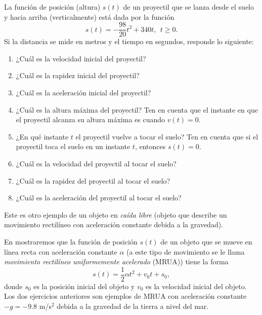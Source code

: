 \documentclass[12pt,a4paper]{book}
\begin{document}
    \begin{ejercicio}\label{ej:255}
        La función de posición (altura) $s(t)$ de un
        proyectil que se lanza desde el suelo y hacia arriba (verticalmente) está dada
        por la función
        \begin{equation*}
            s(t)=-\frac{98}{20}t^{2}+340t,\ \ t\geq 0.
        \end{equation*}
        Si la distancia se mide en metros y el tiempo en segundos, responde lo
        siguiente:
        \begin{enumerate}[nosep]
            \item ¿Cuál es la velocidad inicial del proyectil?
            \item ¿Cuál es la rapidez inicial del proyectil?
            \item ¿Cuál es la aceleración inicial del proyectil?
            \item ¿Cuál es la altura máxima del proyectil? Ten en cuenta que el instante en
            que el proyectil alcanza su altura máxima es cuando $v(t)=0$.
            \item ¿En qué instante $t$ el proyectil vuelve a tocar el suelo? Ten en cuenta que
            si el proyectil toca el suelo en un instante $t$, entonces $s(t)=0$.
            \item ¿Cuál es la velocidad del proyectil al tocar el suelo?
            \item ¿Cuál es la rapidez del proyectil al tocar el suelo?
            \item ¿Cuál es la aceleración del proyectil al tocar el suelo?
        \end{enumerate}
        Este es otro ejemplo de un objeto en \textit{caída libre} (objeto que describe un
        movimiento rectilíneo con aceleración constante debida a la gravedad).
    \end{ejercicio}

    En \cite{nunez2020calculoII} mostraremos que la función de posición $s(t)$ de un objeto que se
    mueve en línea recta con aceleración constante $\alpha$ (a este tipo de movimiento
    se le llama \textit{movimiento rectilíneo uniformemente acelerado} (MRUA)) tiene
    la forma
    \begin{equation*}
        s(t)=\frac{1}{2}\alpha t^{2}+v_{0}t+s_{0},
    \end{equation*}
    donde $s_{0}$ es la posición inicial del objeto y $v_{0}$ es la velocidad inicial del objeto.
    Los dos ejercicios anteriores son ejemplos de MRUA con aceleración constante
    $-g=-9.8$ m/s$^{2}$ debida a la gravedad de la tierra a nivel del mar.
\end{document}
